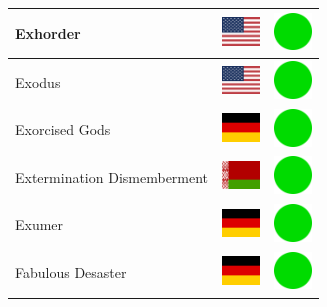 \documentclass[12pt, a4paper, twoside]{report}
\begin{document}
\begin{center}
\begin{longtable}{|p{5cm}|p{2cm}|p{2cm}|}
Exhorder & \includegraphics[width=1cm]{4x3/us} & \includegraphics[width=1cm]{likes/y} \\ \hline
Exodus & \includegraphics[width=1cm]{4x3/us} & \includegraphics[width=1cm]{likes/y} \\ \hline
Exorcised Gods & \includegraphics[width=1cm]{4x3/de} & \includegraphics[width=1cm]{likes/y} \\ \hline
Extermination Dismemberment & \includegraphics[width=1cm]{4x3/by} & \includegraphics[width=1cm]{likes/y} \\ \hline
Exumer & \includegraphics[width=1cm]{4x3/de} & \includegraphics[width=1cm]{likes/y} \\ \hline
Fabulous Desaster & \includegraphics[width=1cm]{4x3/de} & \includegraphics[width=1cm]{likes/y} \\ \hline

\end{longtable}
\end{center}
\end{document}
